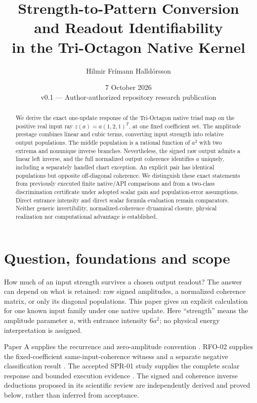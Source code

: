 \documentclass[11pt,a4paper]{article}
\title{\vspace{-12mm}\textbf{Strength-to-Pattern Conversion and Readout Identifiability\\in the Tri-Octagon Native Kernel}}
\author{Hilmir Fr\'imann Halld\'orsson}
\date{7 October 2026\\\small v0.1 --- Author-authorized repository research publication}
\begin{document}
\maketitle
\thispagestyle{fancy}
\begin{abstract}
We derive the exact one-update response of the Tri-Octagon native triad map on the positive real input ray $z(a)=a(1,2,1)^T$, at one fixed coefficient set. The amplitude prestage combines linear and cubic terms, converting input strength into relative output populations. The middle population is a rational function of $a^2$ with two extrema and nonunique inverse branches. Nevertheless, the signed raw output admits a linear left inverse, and the full normalized output coherence identifies $a$ uniquely, including a separately handled chart exception. An explicit pair has identical populations but opposite off-diagonal coherence. We distinguish these exact statements from previously executed finite native/API comparisons and from a two-class discrimination certificate under adopted scalar gain and population-error assumptions. Direct entrance intensity and direct scalar formula evaluation remain comparators. Neither generic invertibility, normalized-coherence dynamical closure, physical realization nor computational advantage is established.
\end{abstract}

\section{Question, foundations and scope}\label{sec:scope}
How much of an input strength survives a chosen output readout? The answer can depend on what is retained: raw signed amplitudes, a normalized coherence matrix, or only its diagonal populations. This paper gives an explicit calculation for one known input family under one native update. Here ``strength'' means the amplitude parameter $a$, with entrance intensity $6a^2$; no physical energy interpretation is assigned.

Paper A supplies the recurrence and zero-amplitude convention \cite{paperA}. RFO-02 supplies the fixed-coefficient same-input-coherence witness and a separate negative classification result \cite{rfo02}. The accepted SPR-01 study supplies the complete scalar response and bounded execution evidence \cite{spr01}. The signed and coherence inverse deductions proposed in its scientific review \cite{review} are independently derived and proved below, rather than inferred from acceptance.
\end{document}
